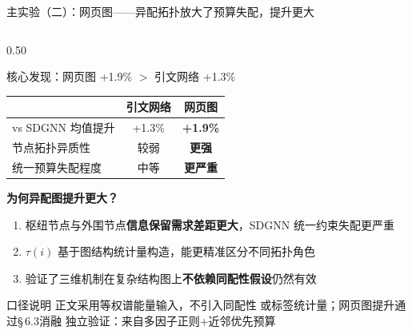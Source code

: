 \documentclass[aspectratio=169,9pt,xcolor=dvipsnames]{beamer}
\newcommand{\highlight}[1]{\textcolor{myred}{\textbf{#1}}}
\newcommand{\blue}[1]{\textcolor{mynavy}{#1}}
\begin{document}
\begin{frame}{主实验（二）：网页图——异配拓扑放大了预算失配，提升更大}
\begin{columns}[T]
\hfill

\begin{column}{0.50\textwidth}
  \begin{alertblock}{核心发现：网页图 +1.9\% $>$ 引文网络 +1.3\%}
    \centering
    \begin{tabular}{lcc}
      & 引文网络 & \highlight{网页图} \\
      \midrule
      vs SDGNN 均值提升 & +1.3\% & \highlight{+1.9\%} \\
      节点拓扑异质性 & 较弱 & \highlight{更强} \\
      统一预算失配程度 & 中等 & \highlight{更严重} \\
    \end{tabular}
  \end{alertblock}

  \medskip
  \textbf{\blue{为何异配图提升更大？}}

  \medskip
  \begin{enumerate}
    \item 枢纽节点与外围节点\textbf{信息保留需求差距更大}，SDGNN 统一约束失配更严重
    \item $\tau(i)$ 基于图结构统计量构造，能更精准区分不同拓扑角色
    \item 验证了三维机制在复杂结构图上\textbf{不依赖同配性假设}仍然有效
  \end{enumerate}

  \begin{block}{口径说明}
    正文采用等权谱能量输入，不引入同配性
    或标签统计量；网页图提升通过§\,6.3消融
    独立验证：来自多因子正则+近邻优先预算
  \end{block}
\end{column}
\end{columns}
\end{frame}
\end{document}
